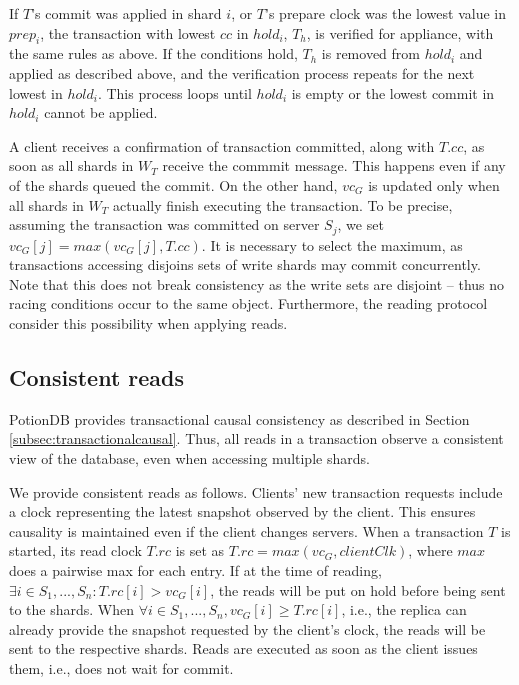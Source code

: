 \documentclass{vldb}
\begin{document}
If $T$'s commit was applied in shard $i$, or $T$'s prepare clock was the lowest value in $\mathit{prep}_i$, 
the transaction with lowest $\mathit{cc}$ in $\mathit{hold}_i$, $T_h$, is verified for appliance, with the same rules as above.
If the conditions hold, $T_h$ is removed from $\mathit{hold}_i$ and applied as described above, 
and the verification process repeats for the next lowest in $\mathit{hold}_i$.
This process loops until $\mathit{hold}_i$ is empty or the lowest commit in $\mathit{hold}_i$ cannot be applied. %

A client receives a confirmation of transaction committed, along with $T\!.\mathit{cc}$, as soon as all shards in $W_T$ receive the commmit message.
This happens even if any of the shards queued the commit.
On the other hand, $\mathit{vc}_G$ is updated only when all shards in $W_T$ actually finish executing the transaction.
To be precise, assuming the transaction was committed on server $S_j$, we set $\mathit{vc}_G[j] = \mathit{max}(\mathit{vc}_G[j], T\!.\mathit{cc})$.
It is necessary to select the maximum, as transactions accessing disjoins sets of write shards may commit concurrently.
Note that this does not break consistency as the write sets are disjoint -- thus no racing conditions occur to the same object.
Furthermore, the reading protocol consider this possibility when applying reads.

\subsection{Consistent reads}
\label{subsec:consistentReads}
PotionDB provides transactional causal consistency as described in Section \ref{subsec:transactionalcausal}.
Thus, all reads in a transaction observe a consistent view of the database, even when accessing multiple shards.

We provide consistent reads as follows.
Clients' new transaction requests include a clock representing the latest snapshot observed by the client. %
This ensures causality is maintained even if the client changes servers.
When a transaction $T$ is started, its read clock $T.rc$ is set as $T.rc = max(vc_G, clientClk)$, where $max$ does a pairwise max for each entry.
If at the time of reading, $\exists i \in S_1, ..., S_n : T.rc[i] > vc_G[i]$, the reads will be put on hold before being sent to the shards. 
When $\forall i \in S_1, ..., S_n, vc_G[i] \geq T.rc[i]$, i.e., the replica can already provide the snapshot requested by the client's clock, the reads will be sent to the respective shards.
Reads are executed as soon as the client issues them, i.e., does not wait for commit. %
\end{document}
